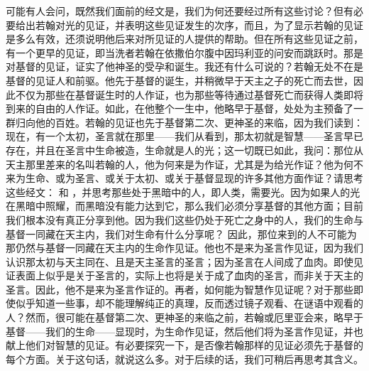 可能有人会问，既然我们面前的经文是，我们为何还要经过所有这些讨论？但有必要给出若翰对光的见证，并表明这些见证发生的次序，而且，为了显示若翰的见证是多么有效，还须说明他后来对所见证的人提供的帮助。但在所有这些见证之前，有一个更早的见证，即当洗者若翰在依撒伯尔腹中因玛利亚的问安而跳跃时。那是对基督的见证，证实了他神圣的受孕和诞生。我还有什么可说的？若翰无处不在是基督的见证人和前驱。他先于基督的诞生，并稍微早于天主之子的死亡而去世，因此不仅为那些在基督诞生时的人作证，也为那些等待通过基督死亡而获得人类即将到来的自由的人作证。如此，在他整个一生中，他略早于基督，处处为主预备了一群归向他的百姓。若翰的见证也先于基督第二次、更神圣的来临，因为我们读到：  现在，有一个太初，圣言就在那里——我们从看到，那太初就是智慧——圣言早已存在，并且在圣言中生命被造，生命就是人的光；这一切既已如此，我问：那位从天主那里差来的名叫若翰的人，他为何来是为作证，尤其是为给光作证？他为何不来为生命、或为圣言、或关于太初、或关于基督显现的许多其他方面作证？请思考这些经文： 和 ，并思考那些处于黑暗中的人，即人类，需要光。因为如果人的光在黑暗中照耀，而黑暗没有能力达到它，那么我们必须分享基督的其他方面；目前我们根本没有真正分享到他。因为我们这些仍处于死亡之身中的人，我们的生命与基督一同藏在天主内，我们对生命有什么分享呢？  因此，那位来到的人不可能为那仍然与基督一同藏在天主内的生命作见证。他也不是来为圣言作见证，因为我们认识那太初与天主同在、且是天主圣言的圣言；因为圣言在人间成了血肉。即使见证表面上似乎是关于圣言的，实际上也将是关于成了血肉的圣言，而非关于天主的圣言。因此，他不是来为圣言作证的。再者，如何能为智慧作见证呢？对于那些即使似乎知道一些事，却不能理解纯正的真理，反而透过镜子观看、在谜语中观看的人？然而，很可能在基督第二次、更神圣的来临之前，若翰或厄里亚会来，略早于基督——我们的生命——显现时，为生命作见证，然后他们将为圣言作见证，并也献上他们对智慧的见证。有必要探究一下，是否像若翰那样的见证必须先于基督的每个方面。关于这句话，就说这么多。对于后续的话，我们可稍后再思考其含义。\par



